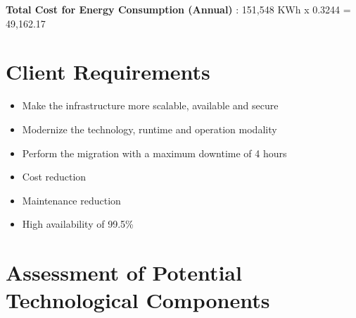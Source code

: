 \documentclass{llncs}
\begin{document}
\textbf{Total Cost for Energy Consumption (Annual)} : 151,548 KWh x 0.3244 \EUR{} = 49,162.17 \EUR{}

\section{Client Requirements}

\begin{itemize}
  \item Make the infrastructure more scalable, available and secure
  \item Modernize the technology, runtime and operation modality
  \item Perform the migration with a maximum downtime of 4 hours
  \item Cost reduction
  \item Maintenance reduction
  \item High availability of 99.5\%
\end{itemize}
\section{Assessment of Potential Technological Components}
\vspace{-60pt}
\end{document}
